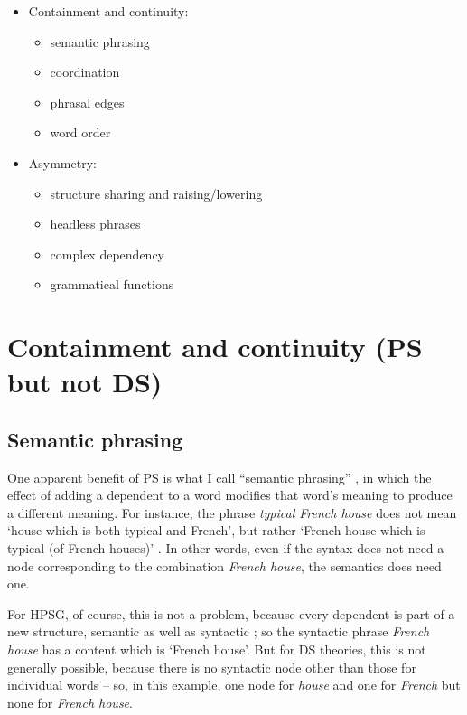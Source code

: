 \documentclass[output=paper,biblatex,babelshorthands,newtxmath,draftmode,colorlinks,citecolor=brown]{langscibook}
\begin{document}
\begin{itemize}
	\item  Containment and continuity:
	\begin{itemize}
		\item semantic phrasing
		
		\item coordination
		
		\item phrasal edges
		
		\item word order
	\end{itemize}

	\item Asymmetry:
	\begin{itemize}
		\item structure sharing and raising/lowering
		
		\item headless phrases
		
		\item complex dependency
		
		\item grammatical functions
	\end{itemize}
\end{itemize}


\section{Containment and continuity (PS but not DS)}
\label{sec:4}

\subsection{Semantic phrasing}
\label{sec:4.1}

One apparent benefit of PS is what I call ``semantic phrasing'' \citep[146–151]{Hudson90a-u}, in
which the effect of adding a dependent to a word modifies that word's meaning to produce a different
meaning. For instance, the phrase \emph{typical French house} does not mean `house which is both
typical and French', but rather `French house which is typical (of French houses)'
\citep[]{Dahl80a}. In other words, even if the syntax does not need a node corresponding to the
combination \emph{French house}, the semantics does need one.

For HPSG, of course, this is not a problem, because every dependent is part of a new structure,
semantic as well as syntactic \citep{MuellerEvaluating}; so the syntactic phrase \emph{French house}
has a content which is `French house'. But for DS theories, this is not generally possible, because
there is no syntactic node other than those for individual words – so, in this example, one node for
\emph{house} and one for \emph{French} but none for \emph{French house}.
\end{document}
